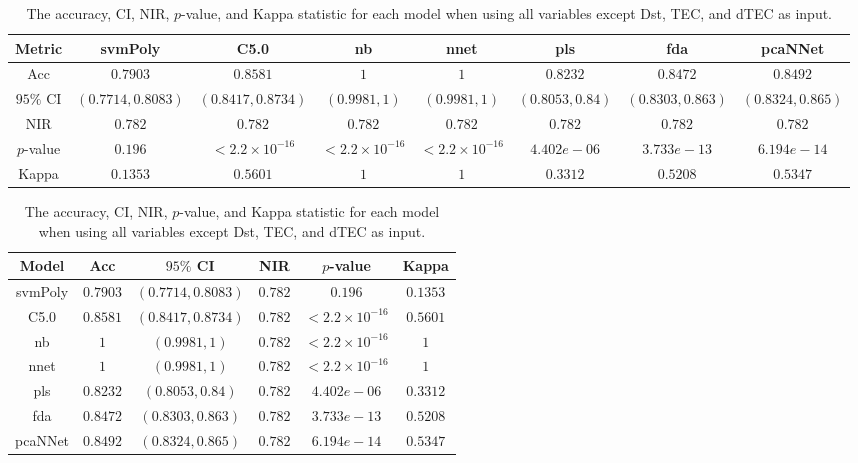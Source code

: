 \begin{table}[!ht]
	\centering
	\begin{tabular}{|c|c|c|c|c|c|c|c|}
		\hline
		Metric & svmPoly & C5.0 & nb & nnet & pls & fda & pcaNNet \\ \hline
		Acc & $0.7903$ & $0.8581$ & $1$ & $1$ & $0.8232$ & $0.8472$ & $0.8492$ \\ \hline
		$95\%$ CI & $(0.7714, 0.8083)$ & $(0.8417, 0.8734)$ & $(0.9981, 1)$ & $(0.9981, 1)$ & $(0.8053, 0.84)$ & $(0.8303, 0.863)$ & $(0.8324, 0.865)$ \\ \hline
		NIR & $0.782$ & $0.782$ & $0.782$ & $0.782$ & $0.782$ & $0.782$ & $0.782$ \\ \hline
		$p$-value & $0.196$ & $< 2.2 \times {10}^{-16}$ & $< 2.2 \times {10}^{-16}$ & $< 2.2 \times {10}^{-16}$ & $4.402e-06$ & $3.733e-13$ & $6.194e-14$ \\ \hline
		Kappa & $0.1353$ & $0.5601$ & $1$ & $1$ & $0.3312$ & $0.5208$ & $0.5347$ \\ \hline
	\end{tabular}
	\caption{The accuracy, CI, NIR, $p$-value, and Kappa statistic for each model when using all variables except Dst, TEC, and dTEC as input.}
	\label{tab:stats:noTEC}
\end{table}

\begin{table}[!ht]
	\centering
	\begin{tabular}{|c|c|c|c|c|c|}
		\hline
		Model & Acc & $95\%$ CI & NIR & $p$-value & Kappa \\ \hline
		svmPoly & $0.7903$ & $(0.7714, 0.8083)$ & $0.782$ & $0.196$ & $0.1353$ \\ \hline
		C5.0 & $0.8581$ & $(0.8417, 0.8734)$ & $0.782$ & $< 2.2 \times {10}^{-16}$ & $0.5601$ \\ \hline
		nb & $1$ & $(0.9981, 1)$ & $0.782$ & $< 2.2 \times {10}^{-16}$ & $1$ \\ \hline
		nnet & $1$ & $(0.9981, 1)$ & $0.782$ & $< 2.2 \times {10}^{-16}$ & $1$ \\ \hline
		pls & $0.8232$ & $(0.8053, 0.84)$ & $0.782$ & $4.402e-06$ & $0.3312$ \\ \hline
		fda & $0.8472$ & $(0.8303, 0.863)$ & $0.782$ & $3.733e-13$ & $0.5208$ \\ \hline
		pcaNNet & $0.8492$ & $(0.8324, 0.865)$ & $0.782$ & $6.194e-14$ & $0.5347$ \\ \hline
	\end{tabular}
	\caption{The accuracy, CI, NIR, $p$-value, and Kappa statistic for each model when using all variables except Dst, TEC, and dTEC as input.}
	\label{tab:stats:reverse:noTEC}
\end{table}

